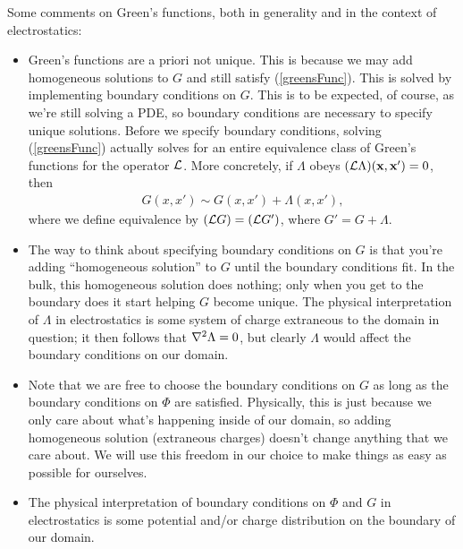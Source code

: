 \documentclass[11pt]{article}
\begin{document}
Some comments on Green's functions, both in generality
and in the context of electrostatics:
\begin{itemize}
    \item Green's functions are a priori not unique. This is because
    we may add homogeneous solutions to $G$ and still satisfy (\ref{greensFunc}).
    This is solved by implementing boundary conditions on $G$. This
    is to be expected, of course, as we're still solving a PDE,
    so boundary conditions are necessary to specify unique solutions.
    Before we specify boundary conditions, solving (\ref{greensFunc})
    actually solves for an entire equivalence class of Green's functions
    for the operator $\mathcal{L}$. More concretely, if $\Lambda$ obeys $(\mathcal{L} \Lambda)(\mathbf{x}, \mathbf{x}') = 0$,
    then
    \begin{align*}
        G(x, x') \sim G(x, x') + \Lambda(x, x'),
    \end{align*}
    where we define equivalence by $(\mathcal{L} G) = (\mathcal{L} G')$,
    where $G' = G + \Lambda$.
    \item The way to think about specifying boundary conditions on $G$ is that you're
    adding ``homogeneous solution'' to $G$ until the boundary conditions
    fit. In the bulk, this homogeneous solution does nothing; only when
    you get to the boundary does it start helping $G$ become unique. The
    physical interpretation of $\Lambda$ in electrostatics is some system of charge
    extraneous to the domain in question; it then follows that $\nabla^2 \Lambda = 0$,
    but clearly $\Lambda$ would affect the boundary conditions on our
    domain.
    \item Note that we are free to choose the boundary conditions on $G$
    as long as the boundary conditions on $\Phi$ are satisfied. Physically, this is
    just because we only care about what's happening inside of our domain,
    so adding homogeneous solution (extraneous charges) doesn't change anything
    that we care about. We will use this freedom in our choice to make
    things as easy as possible for ourselves.
    \item The physical interpretation of boundary conditions on $\Phi$
    and $G$ in electrostatics is some potential and/or charge distribution
    on the boundary of our domain.
\end{itemize}
\end{document}
